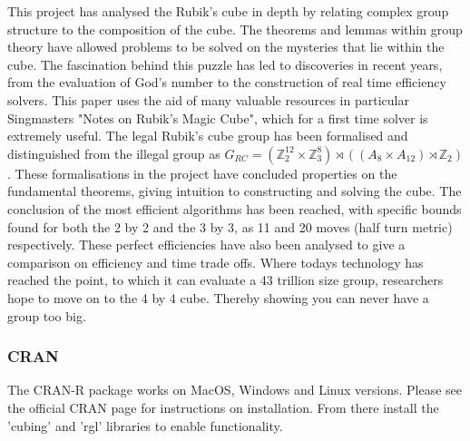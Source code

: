 \documentclass{article}
\newcounter{theo}[section]\setcounter{theo}{0}
\newcounter{prop}[section]\setcounter{prop}{0}
\newcounter{lem}[section]\setcounter{lem}{0}
\begin{document}
This project has analysed the Rubik's cube in depth by relating complex group structure to the composition of the cube. The theorems and lemmas within group theory have allowed problems to be solved on the mysteries that lie within the cube. The fascination behind this puzzle has led to discoveries in recent years, from the evaluation of God's number to the construction of real time efficiency solvers. This paper uses the aid of many valuable resources in particular Singmasters "Notes on Rubik's Magic Cube", which for a first time solver is extremely useful. The legal Rubik's cube group has been formalised and distinguished from the illegal group as $G_{RC}  = (\mathbb{Z}_{2}^{12} \times \mathbb{Z}_{3}^{8}) \rtimes ((A_8 \times A_{12})\rtimes \mathbb{Z}_2)$. These formalisations in the project have concluded properties on the fundamental theorems, giving intuition to constructing and solving the cube. The conclusion of the most efficient algorithms has been reached, with specific bounds found for both the 2 by 2 and the 3 by 3, as 11 and 20 moves (half turn metric) respectively. These perfect efficiencies have also been analysed to give a comparison on efficiency and time trade offs. Where todays technology has reached the point, to which it can evaluate a 43 trillion size group, researchers hope to move on to the 4 by 4 cube. Thereby showing you can never have a group too big.

\paragraph{}
\paragraph{}

\subsubsection{CRAN}
\label{CRAN}
The CRAN-R package works on MacOS, Windows and Linux versions. Please see the official CRAN page for instructions on installation. From there install the 'cubing' and 'rgl' libraries to enable functionality.

\newpage

%
\printbibliography
\end{document}
